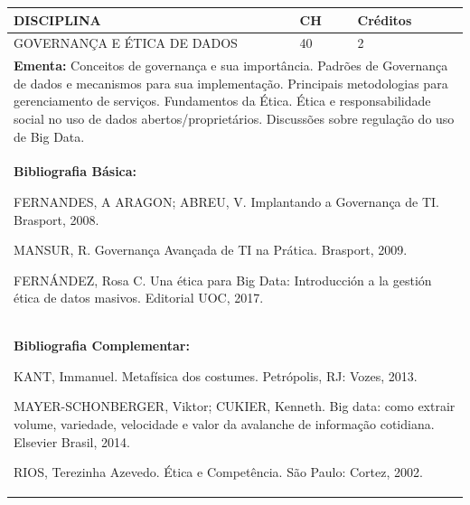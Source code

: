 \documentclass[a4paper, 12pt, openright, oneside, german, french, english, brazil]{abntex2}
\begin{document}
\begin{table}[!h]
  \footnotesize
  \centering
  \begin{tabular}{|p{100mm}|p{10mm}|p{20mm}|}
    \hline
    \textbf{DISCIPLINA} & \textbf{CH} & \textbf{Créditos} \\
    \hline
    GOVERNANÇA E ÉTICA DE DADOS  & 40 & 2 \\
    \hline
    \multicolumn{3}{|p{130mm}|}{\textbf{Ementa:} Conceitos de governança e sua importância. Padrões de Governança de dados e mecanismos para sua implementação. Principais metodologias para gerenciamento de serviços. Fundamentos da Ética. Ética e responsabilidade social no uso de dados abertos/proprietários. Discussões sobre regulação do uso de Big Data. } \\
    \hline
    \multicolumn{3}{|p{130mm}|}{\textbf{Bibliografia Básica:}

    FERNANDES, A ARAGON; ABREU, V. Implantando a Governança de TI. Brasport, 2008.

MANSUR, R. Governança Avançada de TI na Prática. Brasport, 2009.

FERNÁNDEZ, Rosa C. Una ética para Big Data: Introducción a la gestión ética de datos masivos. Editorial UOC, 2017.
} \\
    \hline
    \multicolumn{3}{|p{130mm}|}{\textbf{Bibliografia Complementar:}

    KANT, Immanuel. Metafísica dos costumes. Petrópolis, RJ: Vozes, 2013.

MAYER-SCHONBERGER, Viktor; CUKIER, Kenneth. Big data: como extrair volume,
variedade, velocidade e valor da avalanche de informação cotidiana. Elsevier Brasil, 2014.

RIOS, Terezinha Azevedo. Ética e Competência. São Paulo: Cortez, 2002.
} \\
    \hline
  \end{tabular}
\end{table}
\end{document}
